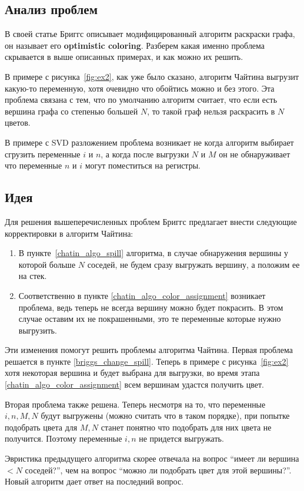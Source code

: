 \subsection{Анализ проблем}

В своей статье Бриггс описывает модифицированный алгоритм раскраски графа, он называет его \textbf{optimistic coloring}.
Разберем какая именно проблема скрывается в выше описанных примерах, и как можно их решить.

В примере с рисунка~\ref{fig:ex2}, как уже было сказано, алгоритм Чайтина выгрузит какую-то переменную,
хотя очевидно что обойтись можно и без этого. Эта проблема связана с тем, что по умолчанию алгоритм считает,
что если есть вершина графа со степенью большей $N$, то такой граф нельзя раскрасить в $N$ цветов.

В примере с SVD разложением проблема возникает не когда алгоритм выбирает сгрузить переменные $i$ и $n$, а когда
после выгрузки $N$ и $M$ он не обнаруживает что переменные $n$ и $i$ могут поместиться на регистры.

\subsection{Идея}

Для решения вышеперечисленных проблем Бриггс предлагает внести следующие корректировки в алгоритм Чайтина:

\begin{enumerate}
    \item В пункте~\ref{chatin_algo_spill} алгоритма, в случае обнаружения вершины у которой больше $N$ соседей,
    не будем сразу выгружать вершину, а положим ее на стек. \label{briggs_change_spill}
    \item Соответственно в пункте \ref{chatin_algo_color_assignment} возникает проблема, ведь теперь не всегда
    вершину можно будет покрасить. В этом случае оставим их не покрашенными, это те переменные которые нужно
    выгрузить.
    
\end{enumerate}

Эти изменения помогут решить проблемы алгоритма Чайтина. Первая проблема решается в пункте \ref{briggs_change_spill}.
Теперь в примере с рисунка~\ref{fig:ex2} хотя некоторая вершина и будет выбрана для выгрузки, во время этапа \ref{chatin_algo_color_assignment}
всем вершинам удастся получить цвет.

Вторая проблема также решена. Теперь несмотря на то, что переменные $i, n, M, N$ будут выгружены (можно считать что в таком
порядке), при попытке подобрать цвета для $M, N$ станет понятно что подобрать для них цвета не получится.
Поэтому переменные $i, n$ не придется выгружать.

Эвристика предыдущего алгоритма скорее отвечала на
вопрос ``имеет ли вершина $< N$ соседей?'', чем на вопрос ``можно ли подобрать цвет для этой вершины?''. Новый
алгоритм дает ответ на последний вопрос.
